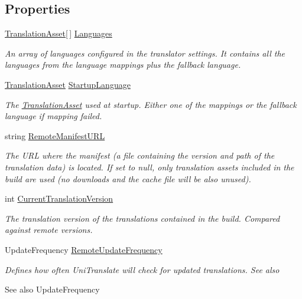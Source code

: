 \subsection*{Properties}
\begin{DoxyCompactItemize}
\item 
\hyperlink{class_translation_asset}{Translation\+Asset}\mbox{[}$\,$\mbox{]} \hyperlink{class_translator_settings_a7993a5fdb36afe44e18437c78a7f965b}{Languages}
\begin{DoxyCompactList}\small\item\em An array of languages configured in the translator settings. It contains all the languages from the language mappings plus the fallback language. \end{DoxyCompactList}\item 
\hyperlink{class_translation_asset}{Translation\+Asset} \hyperlink{class_translator_settings_afad650d280bcf715350fdd971c0a0140}{Startup\+Language}
\begin{DoxyCompactList}\small\item\em The \hyperlink{class_translation_asset}{Translation\+Asset} used at startup. Either one of the mappings or the fallback language if mapping failed. \end{DoxyCompactList}\item 
string \hyperlink{class_translator_settings_aa5bc9368add517c7ba8b0daad0d6812c}{Remote\+Manifest\+U\+RL}
\begin{DoxyCompactList}\small\item\em The U\+RL where the manifest (a file containing the version and path of the translation data) is located. If set to null, only translation assets included in the build are used (no downloads and the cache file will be also unused). \end{DoxyCompactList}\item 
int \hyperlink{class_translator_settings_a2a603738d719808bc6190cb42923e355}{Current\+Translation\+Version}
\begin{DoxyCompactList}\small\item\em The translation version of the translations contained in the build. Compared against remote versions. \end{DoxyCompactList}\item 
Update\+Frequency \hyperlink{class_translator_settings_a7ec0ae9e38d63a03a8f327c7fca65298}{Remote\+Update\+Frequency}
\begin{DoxyCompactList}\small\item\em Defines how often Uni\+Translate will check for updated translations. See also \begin{DoxySeeAlso}{See also}
Update\+Frequency



\end{DoxySeeAlso}
\end{DoxyCompactList}
\end{DoxyCompactItemize}
